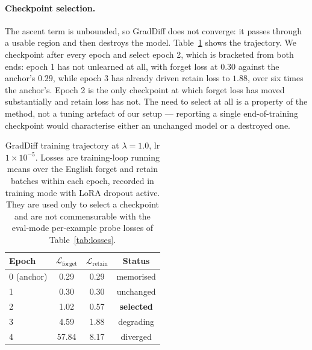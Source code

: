 \documentclass[11pt]{article}
\begin{document}
\paragraph{Checkpoint selection.}
The ascent term is unbounded, so GradDiff does not converge: it passes through
a usable region and then destroys the model. Table~\ref{tab:trajectory} shows
the trajectory. We checkpoint after every epoch and select epoch 2, which is
bracketed from both ends: epoch 1 has not unlearned at all, with forget loss
at $0.30$ against the anchor's $0.29$, while epoch 3 has already driven retain
loss to $1.88$, over six times the anchor's. Epoch 2 is the only checkpoint at
which forget loss has moved
substantially and retain loss has not. The need to select at all is a
property of the method, not a tuning artefact of our setup — reporting a
single end-of-training checkpoint would characterise either an unchanged
model or a destroyed one.

\begin{table}[t]
\centering
\small
\begin{tabular}{lccc}
\toprule
Epoch & $\mathcal{L}_\text{forget}$ & $\mathcal{L}_\text{retain}$ & Status \\
\midrule
0 (anchor) & 0.29 & 0.29 & memorised \\
1 & 0.30 & 0.30 & unchanged \\
2 & 1.02 & 0.57 & \textbf{selected} \\
3 & 4.59 & 1.88 & degrading \\
4 & 57.84 & 8.17 & diverged \\
\bottomrule
\end{tabular}
\caption{GradDiff training trajectory at $\lambda=1.0$,
lr $1{\times}10^{-5}$. Losses are training-loop running means over the English
forget and retain batches within each epoch, recorded in training mode with
LoRA dropout active. They are used only to select a checkpoint and are not
commensurable with the eval-mode per-example probe losses of
Table~\ref{tab:losses}.}
\label{tab:trajectory}
\end{table}
\end{document}
